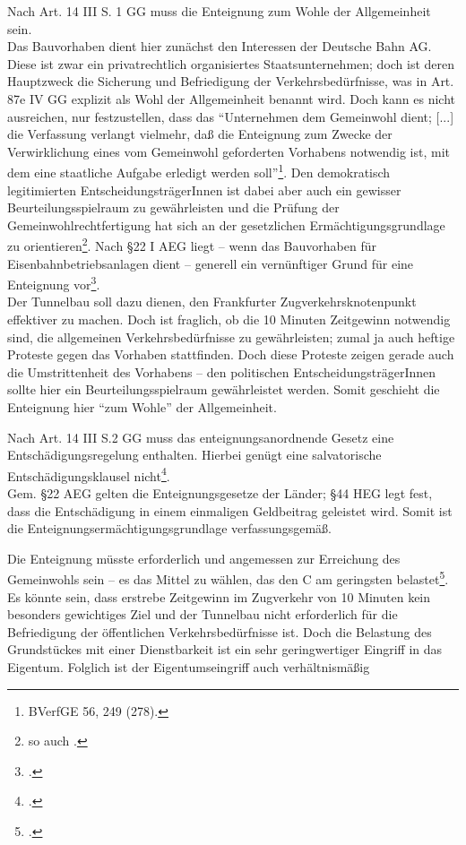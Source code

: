 \documentclass[widefront, ngerman]{jura}
\begin{document}
Nach Art. 14 III S. 1 GG muss die Enteignung zum Wohle der Allgemeinheit sein.\\
Das Bauvorhaben dient hier zunächst den Interessen der Deutsche Bahn AG. Diese ist zwar ein privatrechtlich organisiertes Staatsunternehmen; doch ist deren Hauptzweck die Sicherung und Befriedigung der Verkehrsbedürfnisse, was in Art. 87e IV GG explizit als Wohl der Allgemeinheit benannt wird. Doch kann es nicht ausreichen, nur festzustellen, dass das "`Unternehmen dem Gemeinwohl dient; [...] die Verfassung verlangt vielmehr, daß die Enteignung zum Zwecke der Verwirklichung eines vom Gemeinwohl geforderten Vorhabens notwendig ist, mit dem eine staatliche Aufgabe erledigt werden soll"'\footnote{BVerfGE 56, 249 (278).}. Den demokratisch legitimierten Ent\-schei\-dungs\-trä\-gerInn\-en ist dabei aber auch ein gewisser Beurteilungsspielraum zu gewährleisten und die Prüfung der Gemeinwohlrechtfertigung hat sich an der gesetzlichen Ermächtigungsgrundlage zu orientieren\footnote{so auch \cite[Fn. 400; S. 136ff.]{Steinberg}.}. Nach §22 I AEG liegt -- wenn das Bauvorhaben für Eisenbahnbetriebsanlagen dient -- generell ein vernünftiger Grund für eine Enteignung vor\footcite[S. 232]{Pommer}.\\
Der Tunnelbau soll dazu dienen, den Frankfurter Zugverkehrsknotenpunkt effektiver zu machen. Doch ist fraglich, ob die 10 Minuten Zeitgewinn notwendig sind, die allgemeinen Verkehrsbedürfnisse zu gewährleisten; zumal ja auch heftige Proteste gegen das Vorhaben stattfinden. Doch diese Proteste zeigen gerade auch die Umstrittenheit des Vorhabens -- den politischen EntscheidungsträgerInnen sollte hier ein Beurteilungsspielraum gewährleistet werden. Somit geschieht die Enteignung hier "`zum Wohle"' der Allgemeinheit.


Nach Art. 14 III S.2 GG muss das enteignungsanordnende Gesetz eine Entschädigungsregelung enthalten. Hierbei genügt eine salvatorische Entschädigungsklausel nicht\footcite[Rn 1126f.]{detterbeckVerwR}.\\
Gem. §22 AEG gelten die Enteignungsgesetze der Länder; §44 HEG legt fest, dass die Entschädigung in einem einmaligen Geldbeitrag geleistet wird. Somit ist die Enteignungsermächtigungsgrundlage verfassungsgemäß.


Die Enteignung müsste erforderlich und angemessen zur Erreichung des Gemeinwohls sein -- es das Mittel zu wählen, das den C am geringsten belastet\footcite[S. 205]{Ossenbuehl}.
Es könnte sein, dass erstrebe Zeitgewinn im Zugverkehr von 10 Minuten kein besonders gewichtiges Ziel und der Tunnelbau nicht erforderlich für die Befriedigung der öffentlichen Verkehrsbedürfnisse ist. Doch die Belastung des Grundstückes mit einer Dienstbarkeit ist ein sehr geringwertiger Eingriff in das Eigentum. Folglich ist der Eigentumseingriff auch verhältnismäßig
\end{document}
